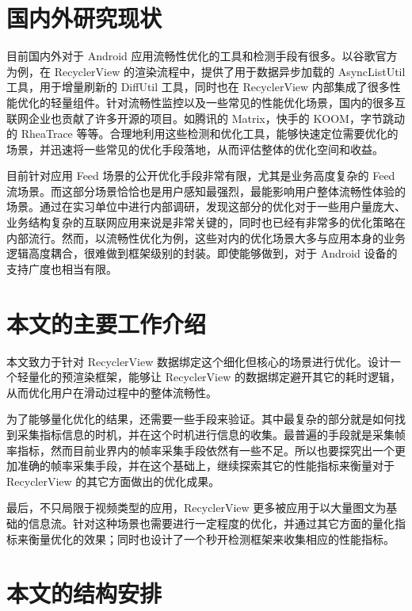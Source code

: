 \section{国内外研究现状}

目前国内外对于 Android 应用流畅性优化的工具和检测手段有很多。以谷歌官方为例，在 RecyclerView 的渲染流程中，提供了用于数据异步加载的 AsyncListUtil 工具，用于增量刷新的 DiffUtil 工具，同时也在 RecyclerView 内部集成了很多性能优化的轻量组件。针对流畅性监控以及一些常见的性能优化场景，国内的很多互联网企业也贡献了许多开源的项目。如腾讯的 Matrix，快手的 KOOM，字节跳动的 RheaTrace 等等。合理地利用这些检测和优化工具，能够快速定位需要优化的场景，并迅速将一些常见的优化手段落地，从而评估整体的优化空间和收益。

目前针对应用 Feed 场景的公开优化手段非常有限，尤其是业务高度复杂的 Feed 流场景。而这部分场景恰恰也是用户感知最强烈，最能影响用户整体流畅性体验的场景。通过在实习单位中进行内部调研，发现这部分的优化对于一些用户量庞大、业务结构复杂的互联网应用来说是非常关键的，同时也已经有非常多的优化策略在内部流行。然而，以流畅性优化为例，这些对内的优化场景大多与应用本身的业务逻辑高度耦合，很难做到框架级别的封装。即使能够做到，对于 Android 设备的支持广度也相当有限。

\section{本文的主要工作介绍}

本文致力于针对 RecyclerView 数据绑定这个细化但核心的场景进行优化。设计一个轻量化的预渲染框架，能够让 RecyclerView 的数据绑定避开其它的耗时逻辑，从而优化用户在滑动过程中的整体流畅性。

为了能够量化优化的结果，还需要一些手段来验证。其中最复杂的部分就是如何找到采集指标信息的时机，并在这个时机进行信息的收集。最普遍的手段就是采集帧率指标，然而目前业界内的帧率采集手段依然有一些不足。所以也要探究出一个更加准确的帧率采集手段，并在这个基础上，继续探索其它的性能指标来衡量对于 RecyclerView 的其它方面做出的优化成果。

最后，不只局限于视频类型的应用，RecyclerView 更多被应用于以大量图文为基础的信息流。针对这种场景也需要进行一定程度的优化，并通过其它方面的量化指标来衡量优化的效果；同时也设计了一个秒开检测框架来收集相应的性能指标。

\section{本文的结构安排}

